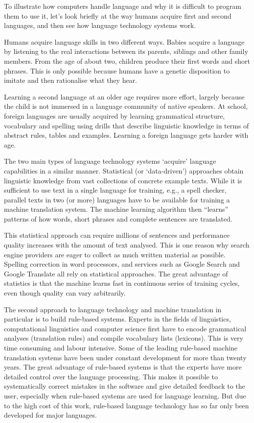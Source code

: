 \documentclass[]{../../metanetpaper}
\begin{document}
\begin{multicols}{2}
    To illustrate how computers handle language and why it is difficult to program them to use it, let’s look briefly at the way humans acquire first and second languages, and then see how language technology systems work. 

    Humans acquire language skills in two different ways. Babies acquire a language by listening to the real interactions between its parents, siblings and other family members. From the age of about two, children produce their first words and short phrases. This is only possible because humans have a genetic disposition to imitate and then rationalise what they hear. 

    Learning a second language at an older age requires more effort, largely because the child is not immersed in a language community of native speakers. At school, foreign languages are usually acquired by learning grammatical structure, vocabulary and spelling using drills that describe linguistic knowledge in terms of abstract rules, tables and examples. Learning a foreign language gets harder with age.

    The two main types of language technology systems ‘acquire’ language capabilities in a similar manner. Statistical (or ‘data-driven’) approaches obtain linguistic knowledge from vast collections of concrete example texts. While it is sufficient to use text in a single language for training, e.g., a spell checker, parallel texts in two (or more) languages have to be available for training a machine translation system. The machine learning algorithm then “learns” patterns of how words, short phrases and complete sentences are translated. 

    This statistical approach can require millions of sentences and performance quality increases with the amount of text analysed. This is one reason why search engine providers are eager to collect as much written material as possible. Spelling correction in word processors, and services such as Google Search and Google Translate all rely on statistical approaches. The great advantage of statistics is that the machine learns fast in continuous series of training cycles, even though quality can vary arbitrarily.

    The second approach to language technology and machine translation in particular is to build rule-based systems. Experts in the fields of linguistics, computational linguistics and computer science first have to encode grammatical analyses (translation rules) and compile vocabulary lists (lexicons). This is very time consuming and labour intensive. Some of the leading rule-based machine translation systems have been under constant development for more than twenty years. The great advantage of rule-based systems is that the experts have more detailed control over the language processing. This makes it possible to systematically correct mistakes in the software and give detailed feedback to the user, especially when rule-based systems are used for language learning. But due to the high cost of this work, rule-based language technology has so far only been developed for major languages. 


\end{multicols}
\end{document}
